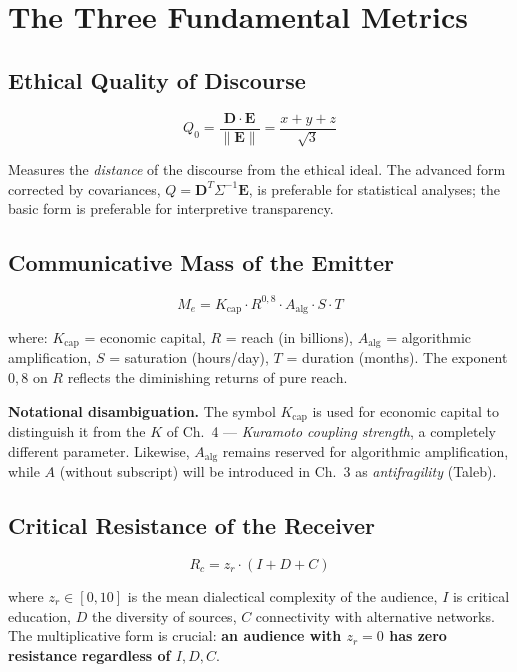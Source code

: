 \section{The Three Fundamental
Metrics}\label{three-fundamental-metrics}

\subsection{Ethical Quality of
Discourse}\label{ethical-quality-discourse}

\[
Q_0 = \frac{\mathbf{D} \cdot \mathbf{E}}{\|\mathbf{E}\|} = \frac{x + y + z}{\sqrt{3}}
\]

Measures the \emph{distance} of the discourse from the ethical ideal. The
advanced form corrected by covariances,
\(Q = \mathbf{D}^T \Sigma^{-1} \mathbf{E}\), is preferable for
statistical analyses; the basic form is preferable for interpretive
transparency.

\subsection{Communicative Mass of the
Emitter}\label{communicative-mass-emitter}

\[
M_e = K_{\text{cap}} \cdot R^{0{,}8} \cdot A_{\text{alg}} \cdot S \cdot T
\]

where: \(K_{\text{cap}}\) = economic capital, \(R\) = reach (in
billions), \(A_{\text{alg}}\) = algorithmic amplification, \(S\) =
saturation (hours/day), \(T\) = duration (months). The exponent
\(0{,}8\) on \(R\) reflects the diminishing returns of pure reach.

\Hypoth{} \textbf{Notational disambiguation.} The symbol
\(K_{\text{cap}}\) is used for economic capital to distinguish it from
the \(K\) of Ch.~4 --- \emph{Kuramoto coupling strength}, a completely
different parameter. Likewise, \(A_{\text{alg}}\) remains reserved for
algorithmic amplification, while \(A\) (without subscript) will be
introduced in Ch.~3 as \emph{antifragility} (Taleb).

\subsection{Critical Resistance of the
Receiver}\label{critical-resistance-receiver}

\[
R_c = z_r \cdot (I + D + C)
\]

where \(z_r \in [0, 10]\) is the mean dialectical complexity of the
audience, \(I\) is critical education, \(D\) the diversity of sources, \(C\)
connectivity with alternative networks. The multiplicative form is
crucial: \textbf{an audience with \(z_r = 0\) has zero resistance
regardless of \(I, D, C\)}.


